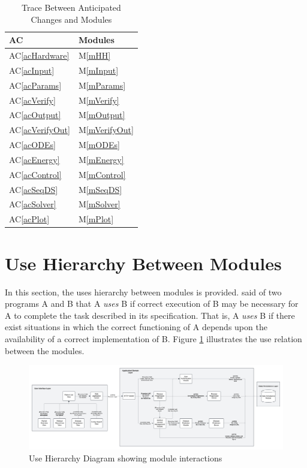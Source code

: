 \documentclass[12pt, titlepage]{article}
\newcommand{\acref}[1]{AC\ref{#1}}
\newcommand{\mref}[1]{M\ref{#1}}
\begin{document}
\begin{table}[H]
\centering
\begin{tabular}{p{} p{}}
\toprule
\textbf{AC} & \textbf{Modules}\\
\midrule
\acref{acHardware} & \mref{mHH}\\
\acref{acInput} & \mref{mInput}\\
\acref{acParams} & \mref{mParams}\\
\acref{acVerify} & \mref{mVerify}\\
\acref{acOutput} & \mref{mOutput}\\
\acref{acVerifyOut} & \mref{mVerifyOut}\\
\acref{acODEs} & \mref{mODEs}\\
\acref{acEnergy} & \mref{mEnergy}\\
\acref{acControl} & \mref{mControl}\\
\acref{acSeqDS} & \mref{mSeqDS}\\
\acref{acSolver} & \mref{mSolver}\\
\acref{acPlot} & \mref{mPlot}\\
\bottomrule
\end{tabular}
\caption{Trace Between Anticipated Changes and Modules}
\label{TblACT}
\end{table}

\section{Use Hierarchy Between Modules} \label{SecUse}

In this section, the uses hierarchy between modules is provided. \citet{Parnas1978} said of two programs A and B that A {\em uses} B if correct execution of B may be necessary for A to complete the task described in its specification. That is, A {\em uses} B if there exist situations in which the correct functioning of A depends upon the availability of a correct implementation of B. Figure \ref{FigUH} illustrates the use relation between the modules.

\begin{figure}[H]
\centering
\includegraphics[width=1.1\textwidth]{../../assets/ContextDesignFlow.png}
\caption{Use Hierarchy Diagram showing module interactions}
\label{FigUH}
\end{figure}
\end{document}
